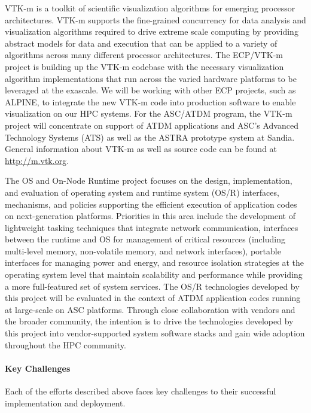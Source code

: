 VTK-m is a toolkit of scientific visualization algorithms for emerging processor architectures. VTK-m supports the fine-grained concurrency for data analysis and visualization algorithms required to drive extreme scale computing by providing abstract models for data and execution that can be applied to a variety of algorithms across many different processor architectures.  The ECP/VTK-m project is building up the VTK-m codebase with the necessary visualization algorithm implementations that run across the varied hardware platforms to be leveraged at the exascale. We will be working with other ECP projects, such as ALPINE, to integrate the new VTK-m code into production software to enable visualization on our HPC systems.  For the ASC/ATDM program, the VTK-m project will concentrate on support of ATDM applications and ASC’s Advanced Technology Systems (ATS) as well as the ASTRA prototype system at Sandia.  General information about VTK-m as well as source code can be found at \url{http://m.vtk.org}.

The OS and On-Node Runtime project focuses on the design, implementation, and evaluation of operating system and runtime system (OS/R) interfaces, mechanisms, and policies supporting the efficient execution of application codes on next-generation platforms. Priorities in this area include the development of lightweight tasking techniques that integrate network communication, interfaces between the runtime and OS for management of critical resources (including multi-level memory, non-volatile memory, and network interfaces), portable interfaces for managing power and energy, and resource isolation strategies at the operating system level that maintain scalability and performance while providing a more full-featured set of system services. The OS/R technologies developed by this project will be evaluated in the context of ATDM application codes running at large-scale on ASC platforms. Through close collaboration with vendors and the broader community, the intention is to drive the technologies developed by this project into vendor-supported system software stacks and gain wide adoption throughout the HPC community.

\paragraph{Key Challenges} %
Each of the efforts described above faces key challenges to their successful implementation and deployment.

